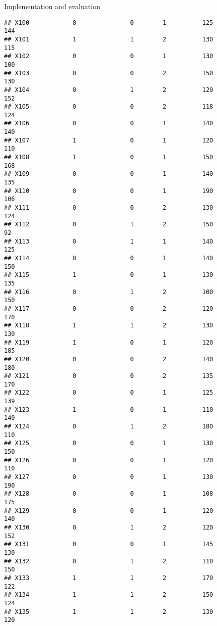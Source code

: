 \documentclass[
  ignorenonframetext,
]{beamer}
\begin{document}
\begin{frame}[fragile]{Implementation and evaluation}
\begin{verbatim}
## X100            0               0        1          125            144
## X101            1               1        2          130            115
## X102            0               0        1          130            100
## X103            0               0        2          150            130
## X104            0               1        2          120            152
## X105            0               0        2          118            124
## X106            0               0        1          140            140
## X107            1               0        1          120            110
## X108            1               0        1          150            168
## X109            0               0        1          140            135
## X110            0               0        1          190            106
## X111            0               0        2          130            124
## X112            0               1        2          150             92
## X113            0               1        1          140            125
## X114            0               0        1          140            150
## X115            1               0        1          130            135
## X116            0               1        2          100            150
## X117            0               0        2          120            170
## X118            1               1        2          130            130
## X119            1               0        1          120            185
## X120            0               0        2          140            180
## X121            0               0        2          135            170
## X122            0               0        1          125            139
## X123            1               0        1          110            140
## X124            0               1        2          180            110
## X125            0               0        1          130            150
## X126            0               0        1          120            110
## X127            0               0        1          130            190
## X128            0               0        1          108            175
## X129            0               0        1          120            140
## X130            0               1        2          120            152
## X131            0               0        1          145            130
## X132            0               1        2          110            150
## X133            1               1        2          170            122
## X134            1               1        2          150            124
## X135            1               1        2          130            120

\end{verbatim}
\end{frame}
\end{document}
